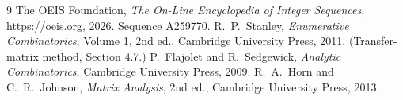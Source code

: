 \documentclass[11pt,a4paper]{article}
\theoremstyle{plain}
\theoremstyle{definition}
\begin{document}
\begin{thebibliography}{9}
 The OEIS Foundation, \emph{The On-Line Encyclopedia of Integer
Sequences}, \url{https://oeis.org}, 2026. Sequence A259770.
 R.~P.~Stanley, \emph{Enumerative Combinatorics}, Volume 1, 2nd ed.,
Cambridge University Press, 2011. (Transfer-matrix method, Section 4.7.)
 P.~Flajolet and R.~Sedgewick, \emph{Analytic Combinatorics}, Cambridge
University Press, 2009.
 R.~A.~Horn and C.~R.~Johnson, \emph{Matrix Analysis}, 2nd ed., Cambridge
University Press, 2013.
\end{thebibliography}
\end{document}
